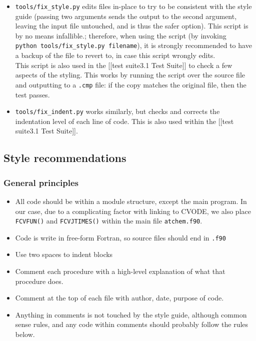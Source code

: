 \begin{itemize}
\item \texttt{tools/fix\_style.py} edits files in-place to try to be
consistent with the style guide (passing two arguments sends the
output to the second argument, leaving the input file untouched, and
is thus the safer option). This script is by no means infallible.;
therefore, when using the script (by invoking \texttt{python\
tools/fix\_style.py\ filename}), it is strongly recommended to have a
backup of the file to revert to, in case this script wrongly edits.\\
This script is also used in the {[}{[}test suite\textbar{}3.1 Test
Suite{]}{]} to check a few aspects of the styling. This works by
running the script over the source file and outputting to a
\texttt{.cmp} file: if the copy matches the original file, then the
test passes.
\item \texttt{tools/fix\_indent.py} works similarly, but checks and
corrects the indentation level of each line of code. This is also used
within the {[}{[}test suite\textbar{}3.1 Test Suite{]}{]}.
\end{itemize}

\subsection{Style recommendations} \label{subsec:style-recommendations}

\subsubsection{General principles} \label{general-principles}

\begin{itemize}
\item All code should be within a module structure, except the main
program.  In our case, due to a complicating factor with linking to
CVODE, we also place \texttt{FCVFUN()} and \texttt{FCVJTIMES()} within
the main file \texttt{atchem.f90}.
\item Code is write in free-form Fortran, so source files should end
in \texttt{.f90}
\item Use two spaces to indent blocks
\item Comment each procedure with a high-level explanation of what
that procedure does.
\item Comment at the top of each file with author, date, purpose of
code.
\item Anything in comments is not touched by the style guide, although
common sense rules, and any code within comments should probably
follow the rules below.
\end{itemize}

